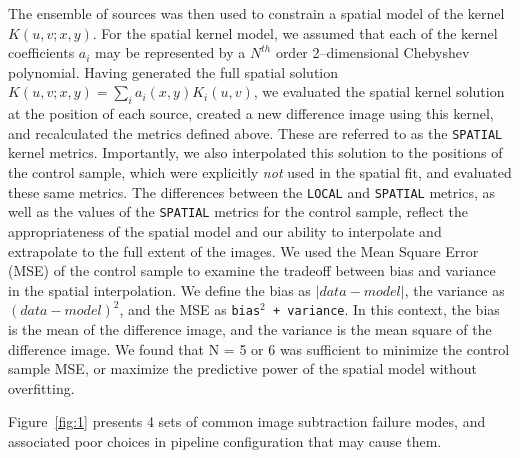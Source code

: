 \documentclass[floatfix, apj]{emulateapj}
\begin{document}
The ensemble of sources was then used to constrain a spatial model of the kernel $K(u,v;x,y)$.
For the spatial kernel model, we assumed that each of the kernel coefficients $a_i$ may be represented by a $N^{th}$ order 2--dimensional Chebyshev polynomial.
Having generated the full spatial solution $K(u,v;x,y) = \sum_i a_i(x,y) K_i(u,v)$, we evaluated the spatial kernel solution at the position of each source, created a new difference image using this kernel, and recalculated the metrics defined above.
These are referred to as the {\tt SPATIAL} kernel metrics.
Importantly, we also interpolated this solution to the positions of the control sample, which were explicitly {\it not} used in the spatial fit, and evaluated these same metrics.
The differences between the {\tt LOCAL} and {\tt SPATIAL} metrics, as well as the values of the {\tt SPATIAL} metrics for the control sample, reflect the appropriateness of the spatial model and our ability to interpolate and extrapolate to the full extent of the images.
We used the Mean Square Error (MSE) of the control sample to examine the tradeoff between bias and variance in the spatial interpolation.
We define the bias as $\left| data - model \right|$, the variance as $(data - model)^2$, and the MSE as {\tt bias$^2$ + variance}.  
In this context, the bias is the mean of the difference image, and the variance is the mean square of the difference image.
We found that N = 5 or 6 was sufficient to minimize the control sample MSE, or maximize the predictive power of the spatial model without overfitting.

Figure~\ref{fig:1} presents 4 sets of common image subtraction failure modes, and associated poor choices in pipeline configuration that may cause them.
\end{document}
